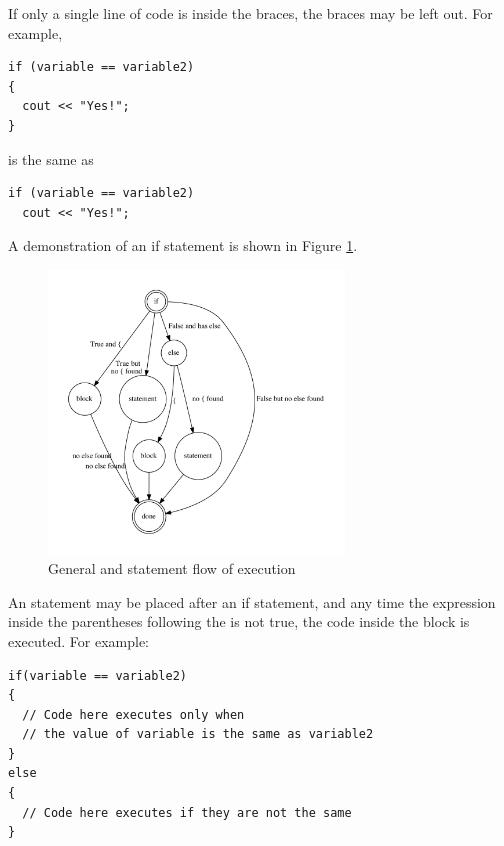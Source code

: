 If only a single line of code is inside the braces, the braces may be left out. 
For example,

\noindent\begin{minipage}{\linewidth}\begin{lstlisting}
if (variable == variable2)
{
  cout << "Yes!";
}
\end{lstlisting}\end{minipage}

\noindent is the same as

\noindent\begin{minipage}{\linewidth}\begin{lstlisting}
if (variable == variable2)
  cout << "Yes!";
\end{lstlisting}\end{minipage}

A demonstration of an if statement is shown in Figure \ref{fig-if-flowchart}.

\begin{figure}[tbh]
  \centering
  \includegraphics[width=0.7\textwidth]{diagrams/if-flow.pdf}
  \caption{General  and  statement flow of execution} \label{fig-if-flowchart}
\end{figure}

An  statement may be placed after an if statement, and any time the expression inside the parentheses following the  is not true, the code inside the  block is executed. 
For example:

\noindent\begin{minipage}{\linewidth}\begin{lstlisting}
if(variable == variable2)
{
  // Code here executes only when
  // the value of variable is the same as variable2
}
else
{
  // Code here executes if they are not the same
}
\end{lstlisting}\end{minipage}

